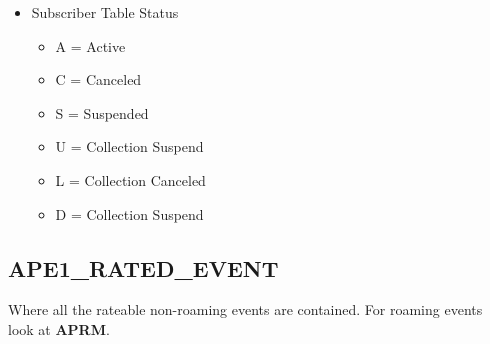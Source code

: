 \documentclass[12pt,twoside]{article}
\begin{document}
\normalsize
\begin{itemize}
\item Subscriber Table Status
\begin{itemize}
\item A = Active
\item C = Canceled
\item S = Suspended
\item U = Collection Suspend
\item L = Collection Canceled
\item D = Collection Suspend
\end{itemize}
\end{itemize}

\newpage 
\subsection{APE1\_RATED\_EVENT}
\label{sec:orgheadline36}
Where all the rateable non-roaming events are contained. For roaming events look at \textbf{APRM}.
\footnotesize
\end{document}
